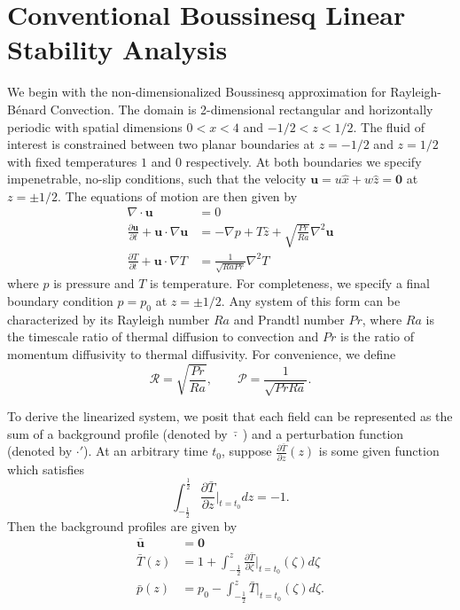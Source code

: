 \documentclass[reprint,amsmath,amssymb,aps]{revtex4-1}
\begin{document}
\section{Conventional Boussinesq Linear Stability Analysis}\label{sec:boussinesq}
We begin with the non-dimensionalized Boussinesq approximation for Rayleigh-Bénard Convection. The domain is 2-dimensional rectangular and horizontally periodic with spatial dimensions $0 < x < 4$ and $-1/2 < z < 1/2$. The fluid of interest is constrained between two planar boundaries at $z = -1/2$ and $z = 1/2$ with fixed temperatures $1$ and $0$ respectively. At both boundaries we specify impenetrable, no-slip conditions, such that the velocity $\mathbf{u} = u \hat{x} + w \hat{z} = \mathbf{0}$ at $z = \pm 1/2$. The equations of motion are then given by
\begin{align}
    \nabla \cdot \mathbf{u} &= 0 \label{EQ:motion1}\\
    \frac{\partial \mathbf{u}}{\partial t} + \mathbf{u} \cdot \nabla \mathbf{u} &= - \nabla p + T \hat{z} + \sqrt{\frac{Pr}{Ra}} \nabla^2 \mathbf{u} \label{EQ:motion2}\\
    \frac{\partial T}{\partial t} + \mathbf{u} \cdot \nabla T &= \frac{1}{\sqrt{RaPr}} \nabla^2 T \label{EQ:motion3}
\end{align}
where $p$ is pressure and $T$ is temperature. For completeness, we specify a final boundary condition $p = p_0$ at $z = \pm 1/2$. Any system of this form can be characterized by its Rayleigh number $Ra$ and Prandtl number $Pr$, where $Ra$ is the timescale ratio of thermal diffusion to convection and $Pr$ is the ratio of momentum diffusivity to thermal diffusivity.  For convenience, we define 
\begin{equation}
\mathcal{R} = \sqrt{\frac{Pr}{Ra}}, \qquad \mathcal{P} = \frac{1}{\sqrt{Pr Ra}}.
\end{equation}
\par To derive the linearized system, we posit that each field can be represented as the sum of a background profile (denoted by $\bar{\cdot } \;$) and a perturbation function (denoted by $\cdot'$). At an arbitrary time $t_0$, suppose $\frac{\partial \bar{T}}{\partial z} (z)$ is some given function which satisfies
\begin{equation}
    \int_{-\frac{1}{2}}^{\frac{1}{2}} \frac{\partial \bar{T}}{\partial z}\Big|_{t=t_0} dz = -1.
\end{equation}
Then the background profiles are given by
\begin{align}
    \mathbf{\bar{u}} &= \mathbf{0} \\
    \bar{T}(z) &= 1 + \int_{-\frac{1}{2}}^{z} \frac{\partial \bar{T}}{\partial \zeta}\Big|_{t=t_0}(\zeta) d\zeta \\
    \bar{p}(z) &= p_0 - \int_{-\frac{1}{2}}^z \bar{T}\Big|_{t=t_0}(\zeta) d\zeta.
\end{align}
\end{document}
